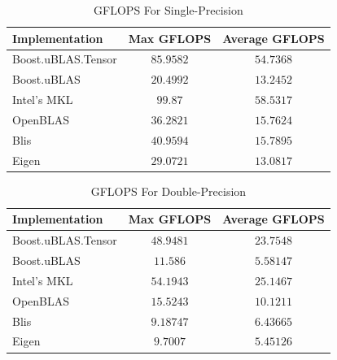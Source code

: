 \begin{table}[ht]
    \centering
    \caption{GFLOPS For Single-Precision}
    \begin{tabular}{|l|c|c|}
        \hline
        \textbf{Implementation} & \textbf{Max GFLOPS} & \textbf{Average GFLOPS}\\
        \hline
        Boost.uBLAS.Tensor  & $85.9582$ & $54.7368$ \\
        \hline
        Boost.uBLAS         & $20.4992$ & $13.2452$ \\
        \hline
        Intel's MKL         & $99.87$ & $58.5317$ \\
        \hline
        OpenBLAS            & $36.2821$ & $15.7624$ \\
        \hline
        Blis                & $40.9594$ & $15.7895$ \\
        \hline
        Eigen               & $29.0721$ & $13.0817$ \\
        \hline
    \end{tabular}
\end{table}

\begin{table}[ht]
    \centering
    \caption{GFLOPS For Double-Precision}
    \begin{tabular}{|l|c|c|}
        \hline
        \textbf{Implementation} & \textbf{Max GFLOPS} & \textbf{Average GFLOPS}\\
        \hline
        Boost.uBLAS.Tensor  & $48.9481$ & $23.7548$ \\
        \hline
        Boost.uBLAS         & $11.586$ & $5.58147$ \\
        \hline
        Intel's MKL         & $54.1943$ & $25.1467$ \\
        \hline
        OpenBLAS            & $15.5243$ & $10.1211$ \\
        \hline
        Blis                & $9.18747$ & $6.43665$ \\
        \hline
        Eigen               & $9.7007$ & $5.45126$ \\
        \hline
    \end{tabular}
\end{table}

